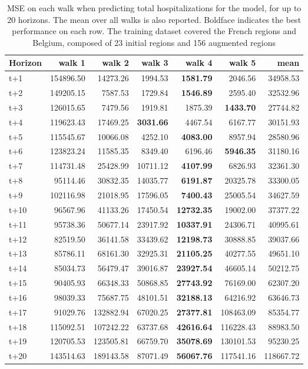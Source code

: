 \begin{table}[H]
\centering
\caption{MSE on each walk when predicting total hospitalizations for the model, for up to 20 horizons. The mean over all walks is also reported. Boldface indicates the best performance on each row. The training dataset covered the French regions and Belgium, composed of 23 initial regions and 156 augmented regions }
\label{tab:MSE_walk_dense_model}
\begin{tabular}{lrrrrrr}
\toprule
Horizon &    walk 1 &    walk 2 &   walk 3 &   walk 4 &    walk 5 &      mean \\
\midrule
t+1  & 154896.50  & 14273.26  & 1994.53  & \textbf{1581.79}  & 2046.56  & 34958.53  \\
t+2  & 149205.15  & 7587.53  & 1729.84  & \textbf{1546.89}  & 2595.40  & 32532.96  \\
t+3  & 126015.65  & 7479.56  & 1919.81  & 1875.39  & \textbf{1433.70}  & 27744.82  \\
t+4  & 119623.43  & 17469.25  & \textbf{3031.66}  & 4467.54  & 6167.77  & 30151.93  \\
t+5  & 115545.67  & 10066.08  & 4252.10  & \textbf{4083.00}  & 8957.94  & 28580.96  \\
t+6  & 123823.24  & 11585.35  & 8349.40  & 6196.46  & \textbf{5946.35}  & 31180.16  \\
t+7  & 114731.48  & 25428.99  & 10711.12  & \textbf{4107.99}  & 6826.93  & 32361.30  \\
t+8  & 95114.46  & 30832.35  & 14035.77  & \textbf{6191.87}  & 20325.78  & 33300.05  \\
t+9  & 102116.98  & 21018.95  & 17596.05  & \textbf{7400.43}  & 25005.54  & 34627.59  \\
t+10  & 96567.96  & 41133.26  & 17450.54  & \textbf{12732.35}  & 19002.00  & 37377.22  \\
t+11  & 95738.36  & 50677.14  & 23917.92  & \textbf{10337.91}  & 24306.71  & 40995.61  \\
t+12  & 82519.50  & 36141.58  & 33439.62  & \textbf{12198.73}  & 30888.85  & 39037.66  \\
t+13  & 85786.11  & 68161.30  & 32925.31  & \textbf{21105.25}  & 40277.55  & 49651.10  \\
t+14  & 85034.73  & 56479.47  & 39016.87  & \textbf{23927.54}  & 46605.14  & 50212.75  \\
t+15  & 90405.93  & 66348.33  & 50868.85  & \textbf{27743.92}  & 76169.00  & 62307.20  \\
t+16  & 98039.33  & 75687.75  & 48101.51  & \textbf{32188.13}  & 64216.92  & 63646.73  \\
t+17  & 91029.76  & 132882.94  & 67020.25  & \textbf{27377.81}  & 108463.09  & 85354.77  \\
t+18  & 115092.51  & 107242.22  & 63737.68  & \textbf{42616.64}  & 116228.43  & 88983.50  \\
t+19  & 120705.53  & 123505.81  & 66759.70  & \textbf{35078.69}  & 130101.53  & 95230.25  \\
t+20  & 143514.63  & 189143.58  & 87071.49  & \textbf{56067.76}  & 117541.16  & 118667.72  \\

\bottomrule
\end{tabular}
\end{table}
